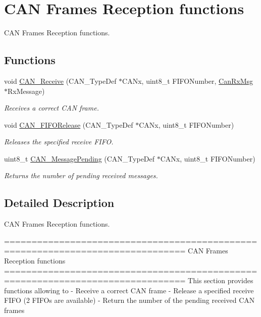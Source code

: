 \hypertarget{group___c_a_n___group3}{\section{C\-A\-N Frames Reception functions}
\label{group___c_a_n___group3}
}


C\-A\-N Frames Reception functions.  


\subsection*{Functions}
\begin{DoxyCompactItemize}
\item 
void \hyperlink{group___c_a_n___group3_ga351b90bb8a3bb0c846f85bbd56ef4dc8}{C\-A\-N\-\_\-\-Receive} (C\-A\-N\-\_\-\-Type\-Def $\ast$C\-A\-Nx, uint8\-\_\-t F\-I\-F\-O\-Number, \hyperlink{struct_can_rx_msg}{Can\-Rx\-Msg} $\ast$Rx\-Message)
\begin{DoxyCompactList}\small\item\em Receives a correct C\-A\-N frame. \end{DoxyCompactList}\item 
void \hyperlink{group___c_a_n___group3_ga1bc3b39471e579b4101624c33d27918b}{C\-A\-N\-\_\-\-F\-I\-F\-O\-Release} (C\-A\-N\-\_\-\-Type\-Def $\ast$C\-A\-Nx, uint8\-\_\-t F\-I\-F\-O\-Number)
\begin{DoxyCompactList}\small\item\em Releases the specified receive F\-I\-F\-O. \end{DoxyCompactList}\item 
uint8\-\_\-t \hyperlink{group___c_a_n___group3_ga7100459a95ce1b3cfe8ab15e112029fe}{C\-A\-N\-\_\-\-Message\-Pending} (C\-A\-N\-\_\-\-Type\-Def $\ast$C\-A\-Nx, uint8\-\_\-t F\-I\-F\-O\-Number)
\begin{DoxyCompactList}\small\item\em Returns the number of pending received messages. \end{DoxyCompactList}\end{DoxyCompactItemize}


\subsection{Detailed Description}
C\-A\-N Frames Reception functions. \begin{DoxyVerb} ===============================================================================
                      CAN Frames Reception functions
 ===============================================================================  
  This section provides functions allowing to 
   -  Receive a correct CAN frame
   -  Release a specified receive FIFO (2 FIFOs are available)
   -  Return the number of the pending received CAN frames\end{DoxyVerb}
 

